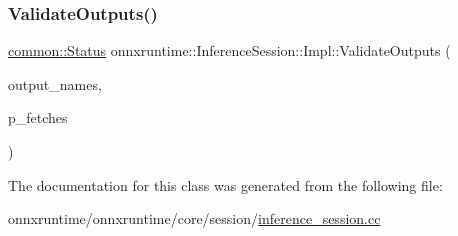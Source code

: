 \mbox{\label{classonnxruntime_1_1InferenceSession_1_1Impl_a9974f44fa1a3bb57053edb9d6c89def5}} 
\subsubsection{\texorpdfstring{Validate\+Outputs()}{ValidateOutputs()}}
{\footnotesize\ttfamily \mbox{\hyperlink{classonnxruntime_1_1common_1_1Status}{common\+::\+Status}} onnxruntime\+::\+Inference\+Session\+::\+Impl\+::\+Validate\+Outputs (\begin{DoxyParamCaption}\item[{const std\+::vector$<$ std\+::string $>$ \&}]{output\+\_\+names,  }\item[{const std\+::vector$<$ \mbox{\hyperlink{classonnxruntime_1_1MLValue}{M\+L\+Value}} $>$ $\ast$}]{p\+\_\+fetches }\end{DoxyParamCaption})\hspace{0.3cm}{\ttfamily [inline]}}



The documentation for this class was generated from the following file\+:\begin{DoxyCompactItemize}
\item 
onnxruntime/onnxruntime/core/session/\mbox{\hyperlink{inference__session_8cc}{inference\+\_\+session.\+cc}}\end{DoxyCompactItemize}

